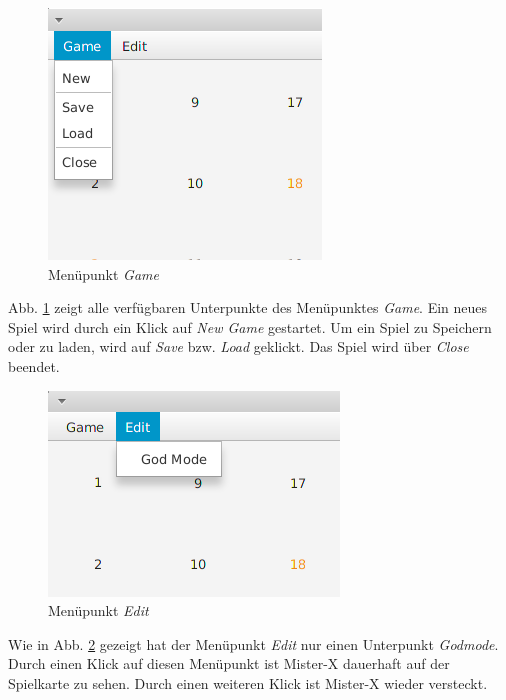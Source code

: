             \begin{figure}[H]
                \centering
                \includegraphics[scale=0.7]{img/benutzerhandbuch/menu_game.png}   
                \caption{Menüpunkt \textit{Game}}
                \label{abb_menuGame}
            \end{figure}
            Abb. \ref{abb_menuGame} zeigt alle verfügbaren Unterpunkte des Menüpunktes \textit{Game}.
            Ein neues Spiel wird durch ein Klick auf \textit{New Game} gestartet.
            Um ein Spiel zu Speichern oder zu laden, wird auf \textit{Save} bzw. \textit{Load} geklickt.
            Das Spiel wird über \textit{Close} beendet.
            \begin{figure}[H]
                \centering
                \includegraphics[scale=0.7]{img/benutzerhandbuch/menu_edit.png}   
                \caption{Menüpunkt \textit{Edit}}
                \label{abb_menu_edit}
            \end{figure}
            Wie in Abb. \ref{abb_menu_edit} gezeigt hat der Menüpunkt \textit{Edit} 
            nur einen Unterpunkt \textit{Godmode}.
            Durch einen Klick auf diesen Menüpunkt ist Mister-X dauerhaft auf der Spielkarte zu sehen.
            Durch einen weiteren Klick ist Mister-X wieder versteckt.
             
